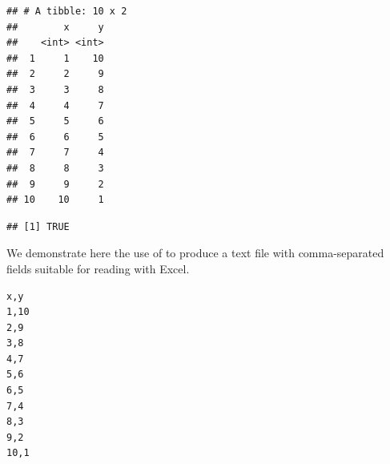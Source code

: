 \documentclass[krantz2,ChapterTOCs]{krantz}\usepackage{knitr}
\begin{document}
\begin{knitrout}\footnotesize
{}\color{fgcolor}\begin{kframe}
\begin{alltt}
 \hlkwb{<-} \hlstd{(} \hlstd{=} \hlstd{)}
\end{alltt}


{\ttfamily\noindent\itshape\color{messagecolor}{\#\# Parsed with column specification:\\\#\# cols(\\\#\#\ \  x = col\_integer(),\\\#\#\ \  y = col\_integer()\\\#\# )}}\begin{alltt}
\end{alltt}
\begin{verbatim}
## # A tibble: 10 x 2
##        x     y
##    <int> <int>
##  1     1    10
##  2     2     9
##  3     3     8
##  4     4     7
##  5     5     6
##  6     6     5
##  7     7     4
##  8     8     3
##  9     9     2
## 10    10     1
\end{verbatim}
\begin{alltt}
  \hlstd{=} \hlstd{)}
\end{alltt}
\begin{verbatim}
## [1] TRUE
\end{verbatim}
\end{kframe}
\end{knitrout}

We demonstrate here the use of  to produce a text file with comma-separated fields suitable for reading with Excel.
\begin{knitrout}\footnotesize
{}\color{fgcolor}\begin{kframe}
\begin{alltt}
  \hlstd{=} \hlstd{)}
\hlstd{(}\hlstd{,}  \hlstd{=} \hlstd{)}
\end{alltt}
\end{kframe}
\end{knitrout}

\begin{knitrout}\footnotesize
{}\color{fgcolor}\begin{kframe}
\begin{verbatim}
﻿x,y
1,10
2,9
3,8
4,7
5,6
6,5
7,4
8,3
9,2
10,1
\end{verbatim}
\end{kframe}
\end{knitrout}
\end{document}
